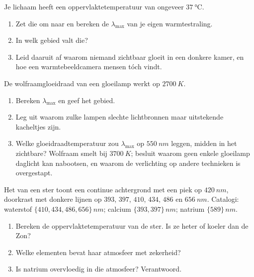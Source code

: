 \begin{exercise}[$\star\star$]\label{exo:g10:light-spectra:11}
Je lichaam heeft een oppervlaktetemperatuur van ongeveer
$\qty{37}{\degreeCelsius}$.
\begin{enumerate}
  \item Zet die om naar  en bereken de $\lambda_{\max}$ van je
        eigen warmtestraling.
  \item In welk gebied valt die?
  \item Leid daaruit af waarom niemand zichtbaar gloeit in een donkere
        kamer, en hoe een warmtebeeldcamera mensen tóch vindt.
\end{enumerate}
\end{exercise}

\begin{exercise}[$\star\star\star$]\label{exo:g10:light-spectra:12}
De wolfraamgloeidraad van een gloeilamp werkt op $\qty{2700}{K}$.
\begin{enumerate}
  \item Bereken $\lambda_{\max}$ en geef het gebied.
  \item Leg uit waarom zulke lampen slechte lichtbronnen maar
        uitstekende kacheltjes zijn.
  \item Welke gloeidraadtemperatuur zou $\lambda_{\max}$ op
        $\qty{550}{nm}$ leggen, midden in het zichtbare? Wolfraam smelt
        bij $\qty{3700}{K}$; besluit waarom geen enkele gloeilamp
        daglicht kan nabootsen, en waarom de verlichting op andere
        technieken is overgestapt.
\end{enumerate}
\end{exercise}

\begin{exercise}[$\star\star\star$]\label{exo:g10:light-spectra:13}
Het  van een ster toont een continue achtergrond met een piek op
$\qty{420}{nm}$, doorkrast met donkere lijnen op $393$, $397$, $410$,
$434$, $486$ en $\qty{656}{nm}$. Catalogi: waterstof
$\{410, 434, 486, 656\}\,\unit{nm}$; calcium $\{393, 397\}\,\unit{nm}$;
natrium $\{589\}\,\unit{nm}$.
\begin{enumerate}
  \item Bereken de oppervlaktetemperatuur van de ster. Is ze heter of
        koeler dan de Zon?
  \item Welke elementen bevat haar atmosfeer met zekerheid?
  \item Is natrium overvloedig in die atmosfeer? Verantwoord.
\end{enumerate}
\end{exercise}

